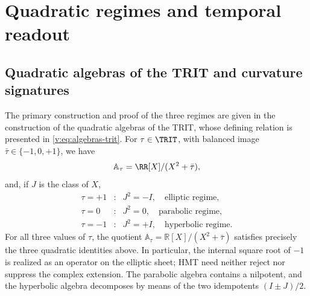 \section{Quadratic regimes and temporal readout}
\label{v:v:rec:chap:regimenes-cuadraticos-tiempo}

\subsection{Quadratic algebras of the TRIT and curvature signatures}
\label{v:v:rec:sec:regimenes-cuadraticos-recibidos}

The primary construction and proof of the three regimes are given in
the construction of the quadratic algebras of the TRIT,
whose defining relation is presented in \eqref{v:eq:algebras-trit}. For
\(\tau\in\TRIT\), with balanced image
\(\bar\tau\in\{-1,0,+1\}\), we have
\[
 \mathbb A_\tau=\RR[X]/(X^2+\bar\tau),
\]
and, if \(J\) is the class of \(X\),
\[
\begin{array}{ccl}
 \tau=+1&:&J^2=-I,\quad\text{elliptic regime},\\
 \tau=0&:&J^2=0,\quad\text{parabolic regime},\\
 \tau=-1&:&J^2=+I,\quad\text{hyperbolic regime}.
\end{array}
\]
For all three values of \(\tau\), the quotient
\(\mathbb A_\tau=\mathbb R[X]/(X^2+\bar\tau)\) satisfies precisely the three
quadratic identities above. In particular, the internal square root of
\(-1\) is realized as an operator on the elliptic sheet; HMT need neither reject nor
suppress the complex extension. The parabolic algebra contains a nilpotent,
and the hyperbolic algebra decomposes by means of the two idempotents
\((I\pm J)/2\).

